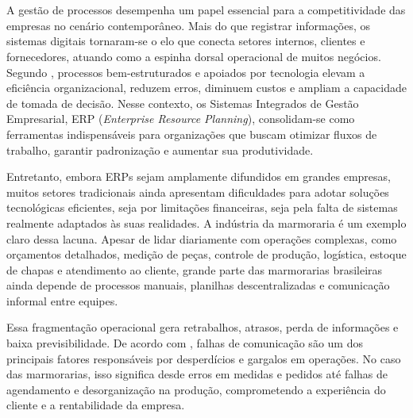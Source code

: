 \chapter*{}
\noindent
{}



\vspace{1.4cm}


A gestão de processos desempenha um papel essencial para a competitividade das empresas no cenário contemporâneo. Mais do que registrar informações, os sistemas digitais tornaram-se o elo que conecta setores internos, clientes e fornecedores, atuando como a espinha dorsal operacional de muitos negócios. Segundo , processos bem-estruturados e apoiados por tecnologia elevam a eficiência organizacional, reduzem erros, diminuem custos e ampliam a capacidade de tomada de decisão. Nesse contexto, os Sistemas Integrados de Gestão Empresarial, ERP (\textit{Enterprise Resource Planning}), consolidam-se como ferramentas indispensáveis para organizações que buscam otimizar fluxos de trabalho, garantir padronização e aumentar sua produtividade.

Entretanto, embora ERPs sejam amplamente difundidos em grandes empresas, muitos setores tradicionais ainda apresentam dificuldades para adotar soluções tecnológicas eficientes, seja por limitações financeiras, seja pela falta de sistemas realmente adaptados às suas realidades. A indústria da marmoraria é um exemplo claro dessa lacuna. Apesar de lidar diariamente com operações complexas, como orçamentos detalhados, medição de peças, controle de produção, logística, estoque de chapas e atendimento ao cliente, grande parte das marmorarias brasileiras ainda depende de processos manuais, planilhas descentralizadas e comunicação informal entre equipes.

Essa fragmentação operacional gera retrabalhos, atrasos, perda de informações e baixa previsibilidade. De acordo com , falhas de comunicação são um dos principais fatores responsáveis por desperdícios e gargalos em operações. No caso das marmorarias, isso significa desde erros em medidas e pedidos até falhas de agendamento e desorganização na produção, comprometendo a experiência do cliente e a rentabilidade da empresa.

